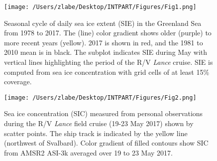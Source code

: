\documentclass[draft,linenumbers]{agujournal}
\begin{document}





\listofchanges



\newpage
\begin{figure}
\texttt{[image: /Users/zlabe/Desktop/INTPART/Figures/Fig1.png]}\\
\caption{Seasonal cycle of daily sea ice extent (SIE) in the Greenland Sea from 1978 to 2017. The (line) color gradient shows older (purple) to more recent years (yellow). 2017 is shown in red, and the 1981 to 2010 mean is in black. The subplot indicates SIE during May with vertical lines highlighting the period of the R/V \textit{Lance} cruise. SIE is computed from sea ice concentration with grid cells of at least 15\% coverage.}\label{fig:1}
\end{figure}

\begin{figure}
\texttt{[image: /Users/zlabe/Desktop/INTPART/Figures/Fig2.png]}\\
\caption{Sea ice concentration (SIC) measured from personal observations during the R/V \textit{Lance} field cruise (19-23 May 2017) shown by scatter points. The ship track is indicated by the yellow line (northwest of Svalbard). Color gradient of filled contours show SIC from AMSR2 ASI-3k averaged over 19 to 23 May 2017.}\label{fig:2}
\end{figure}
\end{document}
